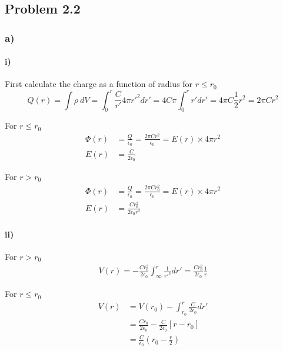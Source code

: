 \documentclass[../homework.tex]{subfiles}
\begin{document}
\subsection{Problem 2.2}
\subsubsection*{a)}

\paragraph{i)}
\begin{subp}

	First calculate the charge as a function of radius for $r \le r_0$
	\begin{equation*}
		Q(r) = \int\rho~dV = \int_{0}^{r} \frac{C}{r'} 4 \pi r'^2 dr' = 4 C \pi \int_{0}^{r} r' dr' = 4\pi C \frac{1}{2} r^2 = 2 \pi C r^2
	\end{equation*}

	For $r \le r_0$
	\begin{align*}
		\Phi(r) & = \frac{Q}{\epsilon_0} = \frac{2 \pi C r^2}{\epsilon_0} = E(r) \times 4 \pi r^2 \\
		E(r)    & = \frac{C}{2 \epsilon_0}
	\end{align*}

	For $r > r_0$
	\begin{align*}
		\Phi(r) & = \frac{Q}{\epsilon_0} = \frac{2\pi C r_0^2}{\epsilon_0} = E(r) \times 4 \pi r^2 \\
		E(r)    & = \frac{Cr_0^2}{2 \epsilon_0 r^2}
	\end{align*}
\end{subp}

\paragraph{ii)}
\begin{subp}
	
	For $r > r_0$
	\begin{align*}
		V(r) = -\frac{C r_0^2}{2\epsilon_0} \int_{\infty}^{r} \frac{1}{r'^2} dr' = \frac{C r_0^2}{2\epsilon_0}\frac{1}{r}
	\end{align*}

	For $r \le r_0$
	\begin{align*}
		V(r) & = V(r_0) - \int_{r_0}^{r} \frac{C}{2\epsilon_0} dr'                      \\
		     & = \frac{C r_0}{2\epsilon_0} - \frac{C}{2 \epsilon_0}\left[r - r_0\right] \\
		     & = \frac{C}{\epsilon_0} \left(r_0-\frac{r}{2}\right)
	\end{align*}
\end{subp}
\end{document}
